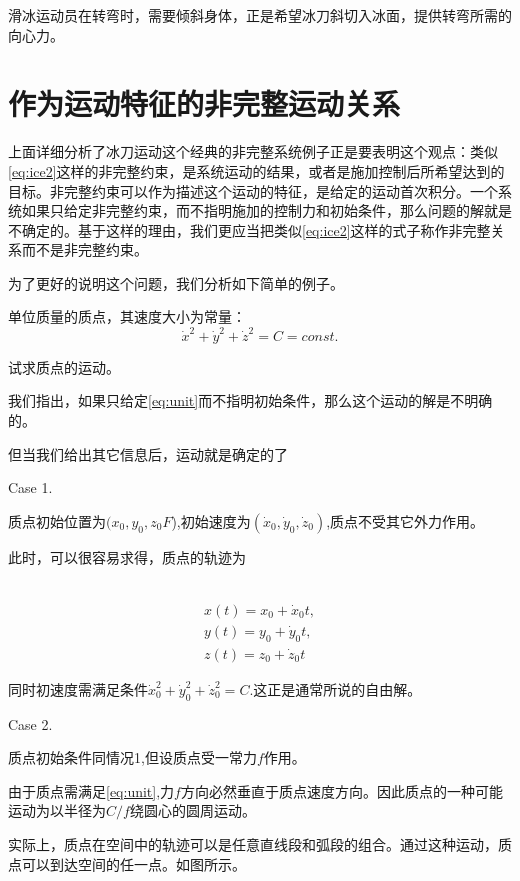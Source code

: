 \documentclass{ctexart}
\begin{document}
滑冰运动员在转弯时，需要倾斜身体，正是希望冰刀斜切入冰面，提供转弯所需的向心力。

\section{作为运动特征的非完整运动关系}

上面详细分析了冰刀运动这个经典的非完整系统例子正是要表明这个观点：类似\eqref{eq:ice2}这样的非完整约束，是系统运动的结果，或者是施加控制后所希望达到的目标。非完整约束可以作为描述这个运动的特征，是给定的运动首次积分。一个系统如果只给定非完整约束，而不指明施加的控制力和初始条件，那么问题的解就是不确定的。基于这样的理由，我们更应当把类似\eqref{eq:ice2}这样的式子称作非完整关系而不是非完整约束。

为了更好的说明这个问题，我们分析如下简单的例子。

\begin{example}
单位质量的质点，其速度大小为常量：
\begin{equation}
  \label{eq:unit}
  \dot{x}^2+\dot{y}^2+\dot{z}^2 = C = const.
\end{equation}

试求质点的运动。


\end{example}

我们指出，如果只给定\eqref{eq:unit}而不指明初始条件，那么这个运动的解是不明确的。

但当我们给出其它信息后，运动就是确定的了

Case 1.

质点初始位置为$(x_0,y_0,z_0F$),初始速度为$(\dot{x}_0,\dot{y}_0,\dot{z}_0)$,质点不受其它外力作用。

此时，可以很容易求得，质点的轨迹为

\
\begin{eqnarray}
  \label{eq:unitsol}
  x(t) = x_0 + \dot{x}_0 t,\\
  y(t) = y_0 + \dot{y}_0 t,\\
  z(t) = z_0 + \dot{z}_0 t
\end{eqnarray}

同时初速度需满足条件$\dot{x}_0^2+\dot{y}_0^2+\dot{z}_0^2 = C$.这正是通常所说的自由解。

Case 2.

质点初始条件同情况1,但设质点受一常力$f$作用。

由于质点需满足\eqref{eq:unit},力$f$方向必然垂直于质点速度方向。因此质点的一种可能运动为以半径为$C/f$绕圆心的圆周运动。


实际上，质点在空间中的轨迹可以是任意直线段和弧段的组合。通过这种运动，质点可以到达空间的任一点。如图所示。
\end{document}
